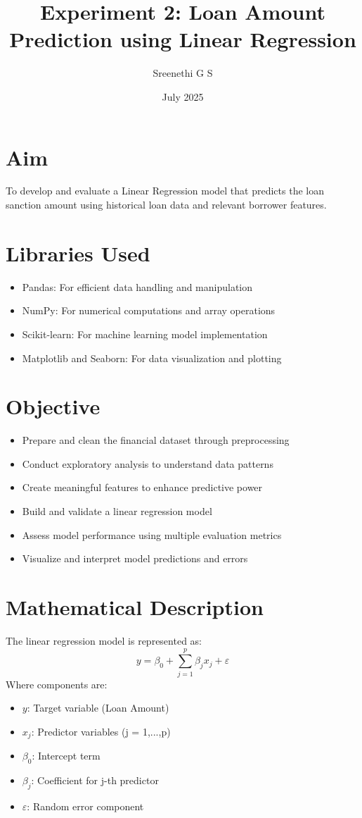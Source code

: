 \documentclass[12pt]{article}
\title{\textbf{Experiment 2: Loan Amount Prediction using Linear Regression}}
\author{Sreenethi G S}
\date{July 2025}
\begin{document}
\maketitle

\section*{Aim}
To develop and evaluate a Linear Regression model that predicts the loan sanction amount using historical loan data and relevant borrower features.

\section*{Libraries Used}
\begin{itemize}
  \item Pandas: For efficient data handling and manipulation
  \item NumPy: For numerical computations and array operations
  \item Scikit-learn: For machine learning model implementation
  \item Matplotlib and Seaborn: For data visualization and plotting
\end{itemize}

\section*{Objective}
\begin{itemize}
  \item Prepare and clean the financial dataset through preprocessing
  \item Conduct exploratory analysis to understand data patterns
  \item Create meaningful features to enhance predictive power
  \item Build and validate a linear regression model
  \item Assess model performance using multiple evaluation metrics
  \item Visualize and interpret model predictions and errors
\end{itemize}

\section*{Mathematical Description}
The linear regression model is represented as:
\[
y = \beta_0 + \sum_{j=1}^p \beta_j x_j + \varepsilon
\]
Where components are:
\begin{itemize}
  \item $y$: Target variable (Loan Amount)
  \item $x_j$: Predictor variables (j = 1,...,p)
  \item $\beta_0$: Intercept term
  \item $\beta_j$: Coefficient for j-th predictor
  \item $\varepsilon$: Random error component
\end{itemize}
\end{document}
